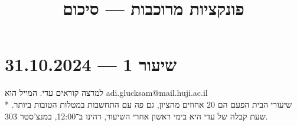 
\title{פונקציות מרוכבות --- סיכום}
\setcounter{secnumdepth}{2}

\hypersetup{}

\maketitle
\maketitleprint{}

\tableofcontents

\section{שיעור 1 --- 31.10.2024}
למרצה קוראים עדי. המייל הוא adi.glucksam@mail.huji.ac.il \\*
שיעורי הבית הפעם הם 20 אחוזים מהציון, גם פה עם התחשבות במטלות הטובות ביותר.
שעת קבלה של עדי היא בימי ראשון אחרי השיעור, דהינו ב־12:00, במנצ'סטר 303.

